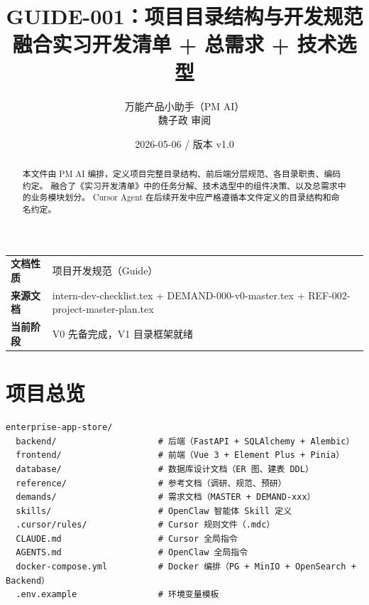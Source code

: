 \documentclass[11pt,a4paper]{article}
\title{\textbf{GUIDE-001：项目目录结构与开发规范}\\[0.5em]\small 融合实习开发清单 + 总需求 + 技术选型}
\author{万能产品小助手（PM AI）\\魏子政 审阅}
\date{2026-05-06 / 版本 v1.0}
\begin{document}
\maketitle

\begin{center}
\begin{tabular}{>{\bfseries}p{3cm} p{10cm}}
\toprule
文档性质 & 项目开发规范（Guide） \\
来源文档 & intern-dev-checklist.tex + DEMAND-000-v0-master.tex + REF-002-project-master-plan.tex \\
当前阶段 & V0 先备完成，V1 目录框架就绪 \\
\bottomrule
\end{tabular}
\end{center}

\vspace{1em}

\begin{abstract}
本文件由 PM AI 编排，定义项目完整目录结构、前后端分层规范、各目录职责、编码约定。
融合了《实习开发清单》中的任务分解、技术选型中的组件决策、以及总需求中的业务模块划分。
Cursor Agent 在后续开发中应严格遵循本文件定义的目录结构和命名约定。
\end{abstract}

\newpage
\tableofcontents
\newpage

\section{项目总览}

\begin{lstlisting}[basicstyle=\ttfamily\footnotesize, frame=single]
enterprise-app-store/
  backend/                    # 后端（FastAPI + SQLAlchemy + Alembic）
  frontend/                   # 前端（Vue 3 + Element Plus + Pinia）
  database/                   # 数据库设计文档（ER 图、建表 DDL）
  reference/                  # 参考文档（调研、规范、预研）
  demands/                    # 需求文档（MASTER + DEMAND-xxx）
  skills/                     # OpenClaw 智能体 Skill 定义
  .cursor/rules/              # Cursor 规则文件（.mdc）
  CLAUDE.md                   # Cursor 全局指令
  AGENTS.md                   # OpenClaw 全局指令
  docker-compose.yml          # Docker 编排（PG + MinIO + OpenSearch + Backend）
  .env.example                # 环境变量模板
\end{lstlisting}
\end{document}
